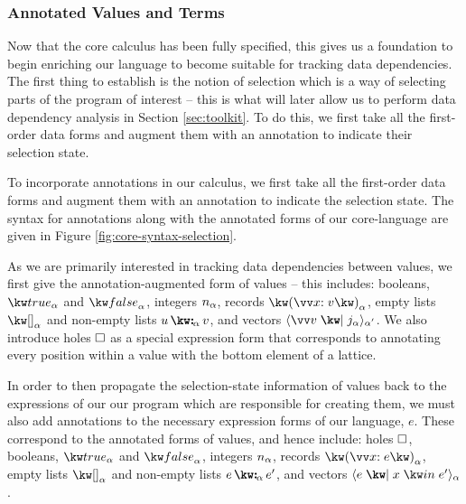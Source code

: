 

\subsubsection{Annotated Values and Terms}

Now that the core calculus has been fully specified, this gives us a foundation to begin enriching our language to become suitable for tracking data dependencies. The first thing to establish is the notion of selection which is a way of selecting parts of the program of interest -- this is what will later allow us to perform data dependency analysis in Section \ref{sec:toolkit}. To do this, we first take all the first-order data forms and augment them with an annotation to indicate their selection state.



\noindent
To incorporate annotations in our calculus, we first take all the first-order data forms and augment them with an annotation to indicate the selection state. The syntax for annotations along with the annotated forms of our core-language are given in Figure \ref{fig:core-syntax-selection}. 

As we are primarily interested in tracking data dependencies between values, we first give the annotation-augmented form of values -- this includes: booleans, $\annTrue{\alpha}$ and $\annFalse{\alpha}$, integers $n_{\alpha}$, records $\annRec{\vec{\bind{x}{v}}}{\alpha}$, empty lists $\annNil{\alpha}$ and non-empty lists $\annCons{u}{v}{\alpha}$, and vectors $\annVecVal{\vec{v}}{\annInt{j}{\alpha}}{\smash{\alpha'}}$. We also introduce holes $\square$ as a special expression form that corresponds to annotating every position within a value with the bottom element of a lattice.

In order to then propagate the selection-state information of values back to the expressions of our our program which are responsible for creating them, we must also add annotations to the necessary expression forms of our language, $e$. These correspond to the annotated forms of values, and hence include: holes $\square$, booleans, $\annTrue{\alpha}$ and $\annFalse{\alpha}$, integers $n_{\alpha}$, records $\annRec{\vec{\bind{x}{e}}}{\alpha}$, empty lists $\annNil{\alpha}$ and non-empty lists $\annCons{e}{e'}{\alpha}$, and vectors $\annVec{e}{x}{e'}{\alpha}$.

